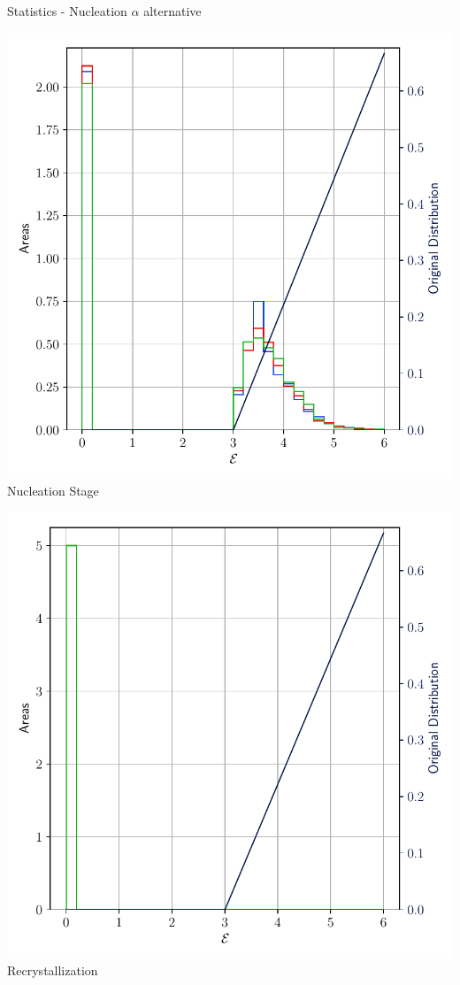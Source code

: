 \documentclass[usenames,dvipsnames]{beamer}
\begin{document}
\begin{frame}{Statistics - Nucleation $\alpha$ alternative}
\small
    \begin{minipage}{0.5\textwidth}
    \centering
    \includegraphics[scale=0.4]{figures/stored_energy/SE/se/000110_nuclalternative_set.pdf}\\
    Nucleation Stage
    \end{minipage}%
    \begin{minipage}{0.5\textwidth}
    \centering
    \includegraphics[scale=0.4]{figures/stored_energy/SE/se/000240_nuclalternative_set.pdf}\\
    Recrystallization
    \end{minipage}
\end{frame}
\end{document}
